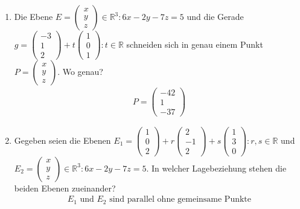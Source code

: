 \documentclass[12pt]{article}
\begin{document}

\noindent
\begin{enumerate}[start=1,label={\bfseries Frage \arabic*:},leftmargin=1in]

    \item Die Ebene $E={\begin{pmatrix} x \\ y \\ z \end{pmatrix} \in \mathbb{R}^3 : 6x - 2y -7z = 5 }$ und die Gerade \\
          $g={\begin{pmatrix} -3 \\ 1 \\ 2 \end{pmatrix} + t \begin{pmatrix} 1 \\ 0 \\ 1 \end{pmatrix} : t \in \mathbb{R} }$
          schneiden sich in genau einem Punkt $P=\begin{pmatrix} x \\ y \\ z \end{pmatrix}$. Wo genau?
    \begin{align*}
        P = \begin{pmatrix} -42 \\ 1 \\ -37 \end{pmatrix}
    \end{align*}

    \item Gegeben seien die Ebenen $E_1 = {\begin{pmatrix} 1 \\ 0 \\ 2 \end{pmatrix} + r \begin{pmatrix} 2 \\ -1 \\ 2 \end{pmatrix}
          + s \begin{pmatrix} 1 \\ 3 \\ 0 \end{pmatrix} : r , s \in \mathbb{R} }$ und $E_2 = {\begin{pmatrix} x \\ y \\ z \end{pmatrix}
          \in \mathbb{R}^3 : 6x - 2y - 7z = 5}$. In welcher Lagebeziehung stehen die beiden Ebenen zueinander?
    \begin{align*}
        E_1 \text{ und } E_2 \text{ sind parallel ohne gemeinsame Punkte}
    \end{align*} 
 

\end{enumerate}
\end{document}
